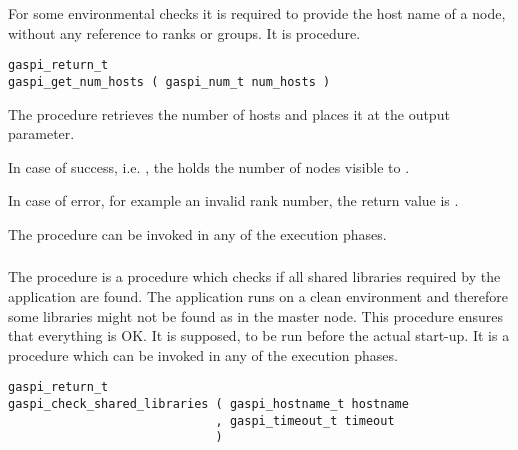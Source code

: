 For some environmental checks it is required to provide the host name
of a node, without any reference to ranks or groups. It is
  procedure.

\begin{FDef}
\begin{FDefSign}
\begin{verbatim}
gaspi_return_t
gaspi_get_num_hosts ( gaspi_num_t num_hosts )
\end{verbatim}
\end{FDefSign}
\parameterlistbegin
{}
\parameterlistend
\FStdRetDescNOTimeout
\end{FDef}

The procedure  retrieves the number of
hosts and places it at
the  output parameter.

In case of success, i.e. \GASPISUCC{}, the  holds
the number of nodes visible to \GASPI{}.

In case of error, for example an invalid rank number, the return value
is \GASPIGERR{}.

The procedure can be invoked in any of the \GASPI{} execution phases.

\subsubsection{}

The  procedure is a
  procedure which checks if all shared
libraries required by the application are found. The application runs
on a clean environment and therefore some libraries might not be found
as in the master node. This procedure ensures that everything is OK.
It is supposed, to be run before the actual \GASPI{} start-up.
It is a procedure
which can be invoked in any of the \GASPI{} execution phases.

\begin{FDef}
\begin{FDefSign}
\begin{verbatim}
gaspi_return_t
gaspi_check_shared_libraries ( gaspi_hostname_t hostname
                             , gaspi_timeout_t timeout
                             )
\end{verbatim}
\end{FDefSign}
\parameterlistbegin
{}
\parameterlistend
\FStdRetDesc
\end{FDef}

